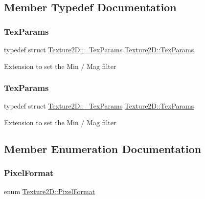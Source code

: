 \subsection{Member Typedef Documentation}
\mbox{\label{classTexture2D_af2ea04a3dfcdf7274db17dda4bd555e3}} 
\subsubsection{\texorpdfstring{Tex\+Params}{TexParams}\hspace{0.1cm}{\footnotesize\ttfamily [1/2]}}
{\footnotesize\ttfamily typedef struct \hyperlink{structTexture2D_1_1__TexParams}{Texture2\+D\+::\+\_\+\+Tex\+Params} \hyperlink{classTexture2D_af2ea04a3dfcdf7274db17dda4bd555e3}{Texture2\+D\+::\+Tex\+Params}}

Extension to set the Min / Mag filter \mbox{\label{classTexture2D_af2ea04a3dfcdf7274db17dda4bd555e3}} 
\subsubsection{\texorpdfstring{Tex\+Params}{TexParams}\hspace{0.1cm}{\footnotesize\ttfamily [2/2]}}
{\footnotesize\ttfamily typedef struct \hyperlink{structTexture2D_1_1__TexParams}{Texture2\+D\+::\+\_\+\+Tex\+Params} \hyperlink{classTexture2D_af2ea04a3dfcdf7274db17dda4bd555e3}{Texture2\+D\+::\+Tex\+Params}}

Extension to set the Min / Mag filter 

\subsection{Member Enumeration Documentation}
\mbox{\label{classTexture2D_a45d9d8bb5a0669def36bbdfbfb91d220}} 
\subsubsection{\texorpdfstring{Pixel\+Format}{PixelFormat}\hspace{0.1cm}{\footnotesize\ttfamily [1/2]}}
{\footnotesize\ttfamily enum \hyperlink{classTexture2D_a45d9d8bb5a0669def36bbdfbfb91d220}{Texture2\+D\+::\+Pixel\+Format}\hspace{0.3cm}{\ttfamily [strong]}}

